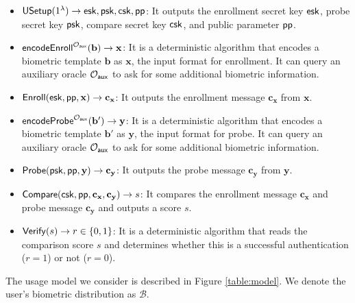 \begin{itemize}

	\item ${\sf USetup}(1^\lambda) \to {\sf esk}, {\sf psk}, {\sf csk}, {\sf pp}$: It outputs the enrollment secret key ${\sf esk}$, probe secret key ${\sf psk}$, compare secret key $\sf csk$, and public parameter ${\sf pp}$.

	\item ${\sf encodeEnroll}^{\mathcal{O}_{\sf aux}}({\mathbf{b}}) \to \mathbf{x}$: It is a deterministic algorithm that encodes a biometric template $\mathbf{b}$ as $\mathbf{x}$, the input format for enrollment. It can query an auxiliary oracle $\mathcal{O}_{\sf aux}$ to ask for some additional biometric information. 

	\item ${\sf Enroll}({\sf esk}, {\sf pp}, \mathbf{x}) \to \mathbf{c_x}$: It outputs the enrollment message $\mathbf{c_x}$ from $\mathbf{x}$.

	\item ${\sf encodeProbe}^{\mathcal{O}_{\sf aux}}({\mathbf{b'}}) \to \mathbf{y}$: It is a deterministic algorithm that encodes a biometric template $\mathbf{b'}$ as $\mathbf{y}$, the input format for probe. It can query an auxiliary oracle $\mathcal{O}_{\sf aux}$ to ask for some additional biometric information. 

	\item ${\sf Probe}({\sf psk}, {\sf pp}, \mathbf{y}) \to \mathbf{c_y}$: It outputs the probe message $\mathbf{c_y}$ from $\mathbf{y}$.

	\item ${\sf Compare}({\sf csk}, {\sf pp}, \mathbf{c_x}, \mathbf{c_y)} \to s$: It compares the enrollment message $\mathbf{c_x}$ and probe message $\mathbf{c_y}$ and outputs a score $s$.

	\item ${\sf Verify}(s) \to r \in \{0,1\}$: It is a deterministic algorithm that reads the comparison score $s$ and determines whether this is a successful authentication ($r = 1$) or not ($r = 0$).

\end{itemize}


The usage model we consider is described in Figure \ref{table:model}. We denote the user's biometric distribution as $\mathcal{B}$.


